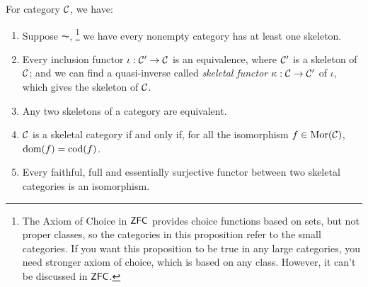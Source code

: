 \documentclass{article}
\begin{document}
\begin{lmm}\label{l4}
	For category $\mathcal{C}$, we have:
	\begin{enumerate}
		\item Suppose $\AC$,
			\footnote{The Axiom of Choice in $\mathsf{ZFC}$ provides choice functions based on sets, but not proper classes, so the categories in this proposition refer to the small categories. If you want this proposition to be true in any large categories, you need stronger axiom of choice, which is based on any class. However, it can't be discussed in $\mathsf{ZFC}$.}
			we have every nonempty category has at least one skeleton.
		\item Every inclusion functor $\iota:\mathcal{C}'\to\mathcal{C}$ is an equivalence, where $\mathcal{C}'$ is a skeleton of $\mathcal{C}$; and we can find a quasi-inverse called \emph{skeletal functor} $\kappa:\mathcal{C}\to\mathcal{C}'$ of $\iota$, which gives the skeleton of $\mathcal{C}$.
		\item Any two skeletons of a category are equivalent.
		\item $\mathcal{C}$ is a skeletal category if and only if, for all the isomorphism $f\in\mathrm{Mor}(\mathcal{C})$, $\mathrm{dom}(f)=\mathrm{cod}(f)$.
		\item Every faithful, full and essentially surjective functor between two skeletal categories is an isomorphism.
	\end{enumerate}
\end{lmm}
\end{document}
